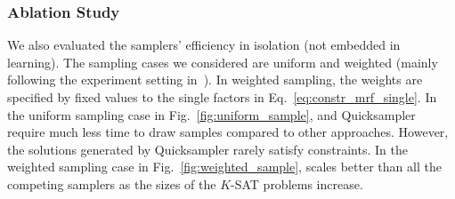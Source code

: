 \subsubsection*{Ablation Study} We also evaluated the samplers' efficiency in isolation (not embedded in
learning).
%
The sampling cases we considered are uniform and weighted (mainly following the
experiment setting in~\citep{DBLP:conf/aaai/ChakrabortyM19}).
%
In weighted sampling, the weights are specified by fixed values to the single
factors in Eq.~\eqref{eq:constr_mrf_single}.
%
In the uniform sampling case in Fig.~\ref{fig:uniform_sample}, \nls and
Quicksampler require much less time to draw samples compared to other
approaches. However, the solutions generated by Quicksampler rarely satisfy
constraints. In the weighted sampling case in Fig.~\ref{fig:weighted_sample},
\nls scales better than all the competing samplers as the sizes of the $K$-SAT
problems increase.

